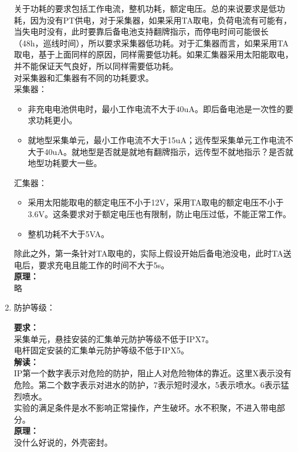 \documentclass{article}
\begin{document}
\begin{CJK}{UTF8}{gbsn}
\begin{enumerate}
	关于功耗的要求包括工作电流，整机功耗，额定电压。总的来说要求是低功耗，因为没有PT供电，对于采集器，如果采用TA取电，负荷电流有可能有，当失电时没有，此时要靠后备电池支持翻牌指示，而停电时间可能很长（48h，巡线时间），所以要求采集器低功耗。对于汇集器而言，如果采用TA取电，基于上面同样的原因，同样需要低功耗。如果汇集器采用太阳能取电，并不能保证天气良好，所以同样需要低功耗。\\
	对采集器和汇集器有不同的功耗要求。\\
	采集器：
	\begin{itemize}
			\item 非充电电池供电时，最小工作电流不大于40uA。即后备电池是一次性的要求功耗更小。
			\item 就地型采集单元，最小工作电流不大于15uA；远传型采集单元工作电流不大于40uA。就地型是否就是就地有翻牌指示，远传型不就地指示？是否就地型功耗要大一些。
	\end{itemize}
	汇集器：
	\begin{itemize}
			\item 采用太阳能取电的额定电压不小于12V，采用TA取电的额定电压不小于3.6V。这条要求对于额定电压也有限制，防止电压过低，不能正常工作。
			\item 整机功耗不大于5VA。
	\end{itemize}
	除此之外，第一条针对TA取电的，实际上假设开始后备电池没电，此时TA送电后，要求充电且能工作的时间不大于5s。\\
	\textbf{原理：}\\
	略
\item 防护等级：
	\par
	\textbf{要求：}\\
	采集单元，悬挂安装的汇集单元防护等级不低于IPX7。\\
	电杆固定安装的汇集单元防护等级不低于IPX5。\\
	\textbf{解读：}\\
	IP第一个数字表示对危险的防护，阻止人对危险物体的靠近。这里X表示没有危险。第二个数字表示对进水的防护，7表示短时浸水，5表示喷水。6表示猛烈喷水。\\
	实验的满足条件是水不影响正常操作，产生破坏。水不积聚，不进入带电部分。\\
	\textbf{原理：}\\
	没什么好说的，外壳密封。

\end{enumerate}

\end{CJK}
\end{document}
